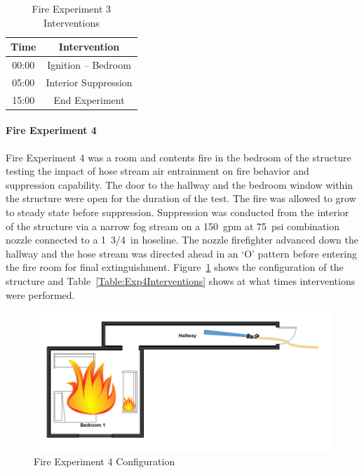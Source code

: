\documentclass[12pt,oneside]{book}
\begin{document}
\begin{table}[H]
	\centering
	\caption{Fire Experiment 3 Interventions}
	\begin{tabular}{|c|c|} 
		\hline
		Time & Intervention \\ \hline \hline
		00:00 & Ignition -- Bedroom \\ \hline
		05:00 & Interior Suppression \\ \hline
		15:00 & End Experiment\\ \hline
	\end{tabular}
	\label{Table:Exp3Interventions}
\end{table}

\clearpage

\paragraph{Fire Experiment 4} \mbox{}

Fire Experiment 4 was a room and contents fire in the bedroom of the structure testing the impact of hose stream air entrainment on fire behavior and suppression capability. The door to the hallway and the bedroom window within the structure were open for the duration of the test. The fire was allowed to grow to steady state before suppression. Suppression was conducted from the interior of the structure via a narrow fog stream on a 150~gpm at 75~psi combination nozzle connected to a 1~3/4~in hoseline. The nozzle firefighter advanced down the hallway and the hose stream was directed ahead in an `O' pattern before entering the fire room for final extinguishment. Figure~\ref{fig:Exp4Config} shows the configuration of the structure and Table~\ref{Table:Exp4Interventions} shows at what times interventions were performed. 


\begin{figure}[H]
	\centering
	\includegraphics[width=5in]{Howard_Exp_4.png}
	\caption{Fire Experiment 4 Configuration}
	\label{fig:Exp4Config}
\end{figure}
\end{document}
